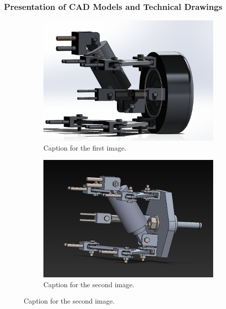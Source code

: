\subsubsection{Presentation of CAD Models and Technical Drawings}
\begin{figure}[ht!]
  \centering
  \begin{subfigure}{.5\textwidth}
    \centering
    \includegraphics[width=\linewidth]{texfiles/mech/eimg/suspension/CAD_Deign of Rear Suspension.png}
    \caption{Caption for the first image.}
    \label{fig:sub1}
  \end{subfigure}%
  \begin{subfigure}{.5\textwidth}
    \centering
    \includegraphics[width=\linewidth]{texfiles/mech/eimg/suspension/CAD Design Front wishbone Assembly.png}
    \caption{Caption for the second image.}
    \label{fig:sub2}
  \end{subfigure}%
\end{figure}
\newpage
